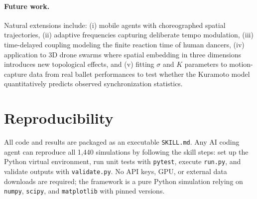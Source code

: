 \documentclass[11pt]{article}
\begin{document}
\paragraph{Future work.}
Natural extensions include: (i) mobile agents with choreographed spatial trajectories,
(ii) adaptive frequencies capturing deliberate tempo modulation, (iii) time-delayed
coupling modeling the finite reaction time of human dancers, (iv) application to
3D drone swarms where spatial embedding in three dimensions introduces new topological
effects, and (v) fitting $\sigma$ and $K$ parameters to motion-capture data from real
ballet performances to test whether the Kuramoto model quantitatively predicts observed
synchronization statistics.

\section*{Reproducibility}

All code and results are packaged as an executable \texttt{SKILL.md}.
Any AI coding agent can reproduce all 1,440 simulations by following the skill steps:
set up the Python virtual environment, run unit tests with \texttt{pytest}, execute
\texttt{run.py}, and validate outputs with \texttt{validate.py}.
No API keys, GPU, or external data downloads are required; the framework is a pure
Python simulation relying on \texttt{numpy}, \texttt{scipy}, and \texttt{matplotlib}
with pinned versions.
\end{document}
